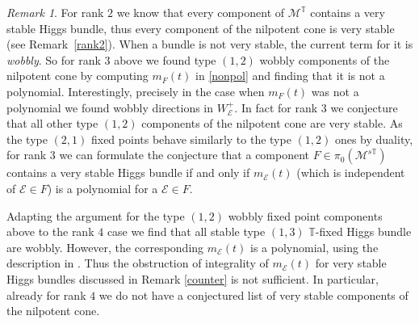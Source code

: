 \documentclass[12pt]{article}
\numberwithin{equation}{section}
\theoremstyle{remark}
\newtheorem{remark}[theorem]{Remark}
\theoremstyle{definition}
\numberwithin{theorem}{section}
\def\calE{{\mathcal E}}
\def\M{{\mathcal{M}}}
\newcommand{\T}{{\mathbb{T}}}
\renewcommand{\1}{\mathbbm{1}}
\begin{document}
\begin{remark} \label{obstruction}  For rank $2$ we know that every component of $\M^\T$ contains a very stable Higgs bundle, thus every component of the nilpotent cone is very stable (see Remark~\ref{rank2}). When a bundle is not very stable, the current term for it is {\em wobbly}. So for  rank $3$ above we found type $(1,2)$ wobbly components of the nilpotent cone by computing $m_{F}(t)$  in \eqref{nonpol} and finding that it is not a polynomial. Interestingly, precisely in the case when $m_{F}(t)$ was not a polynomial we found wobbly directions in $W^+_\calE$.    In fact  for rank $3$ we conjecture that all other type $(1,2)$ components of the nilpotent cone are very stable. As the type $(2,1)$ fixed points behave similarly to the type $(1,2)$ ones by duality, for rank $3$ we can formulate the conjecture that a component  $F\in \pi_0(\M^{s\T})$ contains a very stable Higgs bundle if and only if $m_{\calE}(t)$ (which is independent of $\calE\in F$) is a polynomial for a $\calE\in F$. 
	
	Adapting the argument for the type $(1,2)$ wobbly fixed point components above to the rank  $4$ case  we find that all stable type $(1,3)$ $\T$-fixed Higgs bundle are  wobbly. However,  the corresponding $m_\calE(t)$ is a polynomial, using the description in \cite[Example 6.6]{garcia-prada-heinloth-schmitt}. 
	Thus the obstruction of integrality of $m_\calE(t)$  for very stable Higgs bundles discussed in Remark  \ref{counter} is not sufficient. In particular, already for rank $4$ we do not have a conjectured list of very stable components of the nilpotent cone. 
	
\end{remark}
\end{document}
